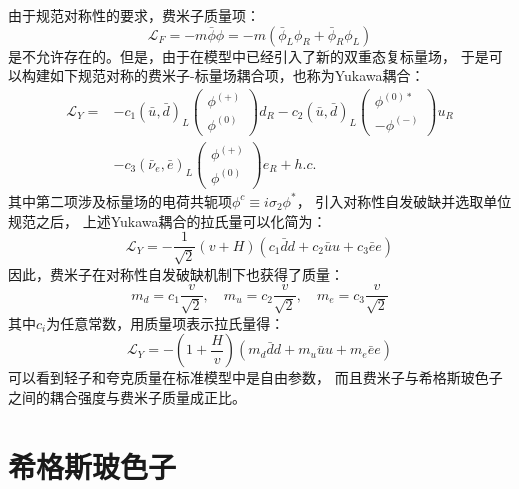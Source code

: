 由于规范对称性的要求，费米子质量项：
\begin{equation} 
\label{eq:SSB18}
\mathcal{L}_F=-m\bar{\phi}\phi=-m(\bar{\phi}_L\phi_R+\bar{\phi}_R\phi_L)
\end{equation}
是不允许存在的。但是，由于在模型中已经引入了新的双重态复标量场，
于是可以构建如下规范对称的费米子-标量场耦合项，也称为Yukawa耦合：
\begin{equation} 
\label{eq:SSB19}
\begin{split}
\mathcal{L}_Y= & -c_1 (\bar{u},\bar{d})_L 
\left( \begin{array}{l} \phi^{(+)} \\  \phi^{(0)} \end{array} \right) d_R
-c_2 (\bar{u},\bar{d})_L 
\left( \begin{array}{l} \phi^{(0)\ast} \\  -\phi^{(-)} \end{array} \right) u_R
\\
& -c_3 (\bar{\nu}_e,\bar{e})_L 
\left( \begin{array}{l} \phi^{(+)} \\  \phi^{(0)} \end{array} \right) e_R
+ h.c.
\end{split}
\end{equation}
其中第二项涉及标量场的电荷共轭项$\phi^c \equiv i\sigma_2 \phi^*$，
引入对称性自发破缺并选取单位规范之后，
上述Yukawa耦合的拉氏量可以化简为：
\begin{equation} 
\label{eq:SSB20}
\mathcal{L}_Y=
-\frac{1}{\sqrt{2}}(v+H)\left(  c_1\bar{d}d+ c_2\bar{u}u +c_3\bar{e}e  \right)
\end{equation}
因此，费米子在对称性自发破缺机制下也获得了质量：
\begin{equation} 
\label{eq:SSB21}
m_d=c_1\frac{v}{\sqrt{2}}, \quad 
m_u=c_2\frac{v}{\sqrt{2}}, \quad 
m_e=c_3\frac{v}{\sqrt{2}}
\end{equation}
其中$c_i$为任意常数，用质量项表示拉氏量得：
\begin{equation} 
\label{eq:SSB22}
\mathcal{L}_Y=
-(1+\frac{H}{v})\left(  m_d\bar{d}d+ m_u\bar{u}u +m_e\bar{e}e  \right)
\end{equation}
可以看到轻子和夸克质量在标准模型中是自由参数，
而且费米子与希格斯玻色子之间的耦合强度与费米子质量成正比。


\section{希格斯玻色子}
\label{sec:Higgs}

